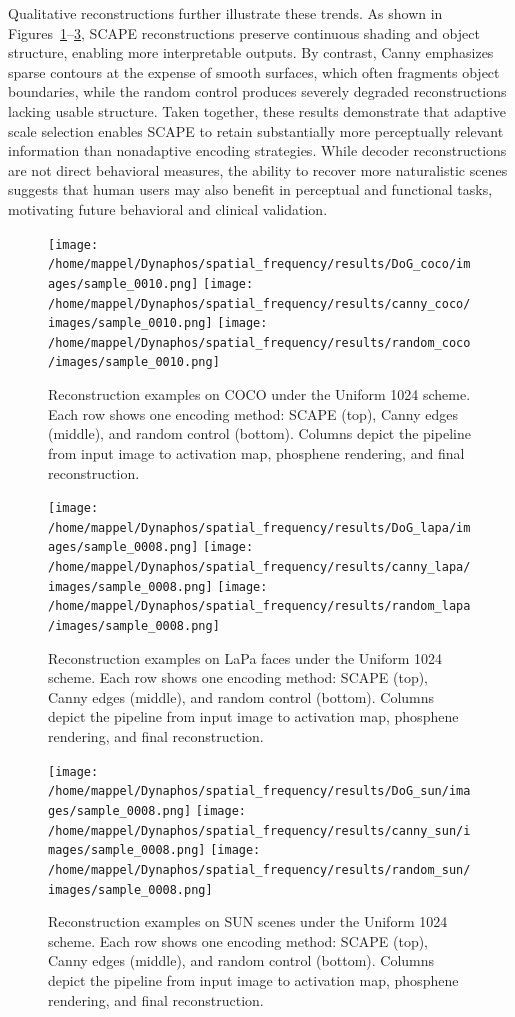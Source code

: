 Qualitative reconstructions further illustrate these trends. 
As shown in Figures~\ref{fig:recon_examples_coco}--\ref{fig:recon_examples_sun}, SCAPE reconstructions preserve continuous shading and object structure, enabling more interpretable outputs. 
By contrast, Canny emphasizes sparse contours at the expense of smooth surfaces, which often fragments object boundaries, while the random control produces severely degraded reconstructions lacking usable structure. 
Taken together, these results demonstrate that adaptive scale selection enables SCAPE to retain substantially more perceptually relevant information than nonadaptive encoding strategies. 
While decoder reconstructions are not direct behavioral measures, the ability to recover more naturalistic scenes suggests that human users may also benefit in perceptual and functional tasks, motivating future behavioral and clinical validation.


\begin{figure}[h]
  \centering
  \texttt{[image: /home/mappel/Dynaphos/spatial\_frequency/results/DoG\_coco/images/sample\_0010.png]}
  \texttt{[image: /home/mappel/Dynaphos/spatial\_frequency/results/canny\_coco/images/sample\_0010.png]}
  \texttt{[image: /home/mappel/Dynaphos/spatial\_frequency/results/random\_coco/images/sample\_0010.png]}
  \caption{Reconstruction examples on COCO under the Uniform 1024 scheme. Each row shows one encoding method: SCAPE (top), Canny edges (middle), and random control (bottom). Columns depict the pipeline from input image to activation map, phosphene rendering, and final reconstruction.}
  \label{fig:recon_examples_coco}
\end{figure}

\begin{figure}[h]
  \centering
  \texttt{[image: /home/mappel/Dynaphos/spatial\_frequency/results/DoG\_lapa/images/sample\_0008.png]}
  \texttt{[image: /home/mappel/Dynaphos/spatial\_frequency/results/canny\_lapa/images/sample\_0008.png]}
  \texttt{[image: /home/mappel/Dynaphos/spatial\_frequency/results/random\_lapa/images/sample\_0008.png]}
  \caption{Reconstruction examples on LaPa faces under the Uniform 1024 scheme. Each row shows one encoding method: SCAPE (top), Canny edges (middle), and random control (bottom). Columns depict the pipeline from input image to activation map, phosphene rendering, and final reconstruction.}
  \label{fig:recon_examples_lapa}
\end{figure}

\begin{figure}[h]
  \centering
  \texttt{[image: /home/mappel/Dynaphos/spatial\_frequency/results/DoG\_sun/images/sample\_0008.png]}
  \texttt{[image: /home/mappel/Dynaphos/spatial\_frequency/results/canny\_sun/images/sample\_0008.png]}
  \texttt{[image: /home/mappel/Dynaphos/spatial\_frequency/results/random\_sun/images/sample\_0008.png]}
  \caption{Reconstruction examples on SUN scenes under the Uniform 1024 scheme. Each row shows one encoding method: SCAPE (top), Canny edges (middle), and random control (bottom). Columns depict the pipeline from input image to activation map, phosphene rendering, and final reconstruction.}
  \label{fig:recon_examples_sun}
\end{figure}





